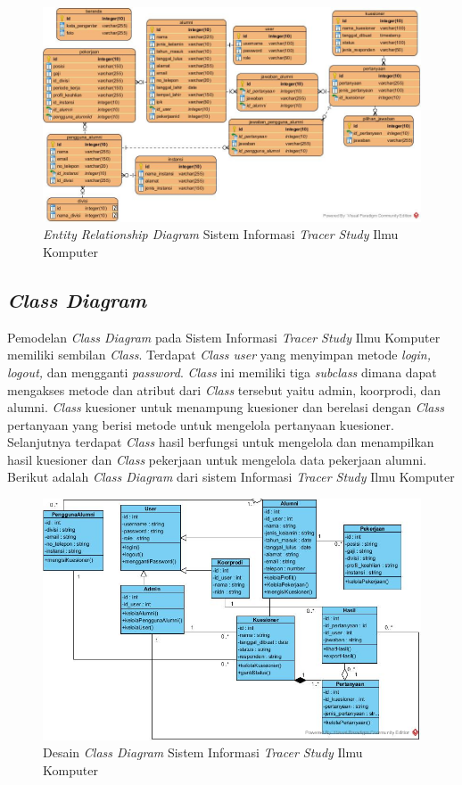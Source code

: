 \begin{figure}[H]
	\centering
	\includegraphics[width=1.0\textwidth]{gambar/erd}
	\caption{\emph{Entity Relationship Diagram} Sistem Informasi \textit{Tracer Study} Ilmu Komputer}
	\label{entityrelationship_diagram}
\end{figure}

\subsection{\textit{Class Diagram}}

Pemodelan \textit{Class Diagram} pada Sistem Informasi \textit{Tracer Study} Ilmu Komputer memiliki sembilan \textit{Class}. Terdapat \textit{Class user} yang menyimpan metode \textit{login, logout,} dan mengganti \textit{password}. \textit{Class} ini memiliki tiga \textit{subclass} dimana dapat mengakses metode dan atribut dari\textit{ Class} tersebut yaitu admin, koorprodi, dan alumni.\textit{ Class} kuesioner untuk menampung kuesioner dan berelasi dengan \textit{Class} pertanyaan yang berisi metode untuk mengelola pertanyaan kuesioner. Selanjutnya terdapat \textit{Class} hasil berfungsi untuk mengelola dan menampilkan hasil kuesioner dan \textit{Class} pekerjaan untuk mengelola data pekerjaan alumni. Berikut adalah \textit{Class Diagram} dari sistem Informasi \textit{Tracer Study} Ilmu Komputer

\begin{figure}[H]
	\centering
	\includegraphics[width=1.0\textwidth]{gambar/class}
	\caption{Desain \emph{Class Diagram} Sistem Informasi \textit{Tracer Study} Ilmu Komputer}
	\label{class_diagram}
\end{figure}


